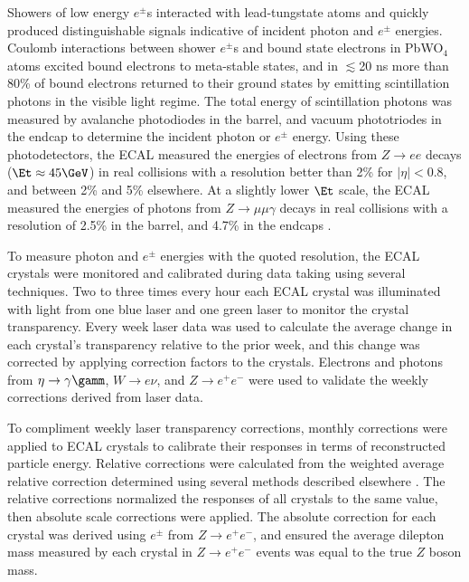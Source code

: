 Showers of low energy $e^{\pm}$s interacted with lead-tungstate atoms and quickly produced distinguishable 
signals indicative of incident photon and $e^{\pm}$ energies.  Coulomb interactions between shower $e^{\pm}$s 
and bound state electrons in PbWO$_{4}$ atoms excited bound electrons to meta-stable states, and in 
$\lesssim$20 ns more than 80\% of bound electrons returned to their ground states by emitting scintillation 
photons in the visible light regime.  The total energy of 
scintillation photons was measured by avalanche photodiodes in the barrel, and vacuum phototriodes in the 
endcap to determine the incident photon or $e^{\pm}$ energy.  Using these photodetectors, the ECAL measured 
the energies of electrons from $Z \rightarrow ee$ decays ($\Et \approx 45 \GeV$) in real collisions with a resolution 
better than 2\% for $|\eta| < 0.8$, and between 2\% and 5\% elsewhere.  
At a slightly lower $\Et$ scale, the ECAL measured the energies of photons from $Z \rightarrow \mu\mu\gamma$ 
decays in real collisions with a resolution of 2.5\% in the barrel, and 4.7\% in the endcaps \cite{ecalPerformanceInCollisions}.

To measure photon and $e^{\pm}$ energies with the quoted resolution, the ECAL crystals were monitored and calibrated 
during data taking using several techniques.  Two to three times every hour each ECAL crystal was illuminated 
with light from one blue laser and one green laser to monitor the crystal transparency.  Every week laser data 
was used to calculate the average change in each crystal's transparency relative to the prior week, and this change 
was corrected by applying correction factors to the crystals.  Electrons and photons from $\eta \rightarrow \gamma\gamm$, 
$W \rightarrow e\nu$, and $Z \rightarrow e^{+}e^{-}$ were used to validate the weekly corrections derived from laser data.

To compliment weekly laser transparency corrections, monthly corrections were applied to ECAL crystals 
to calibrate their responses in terms of reconstructed particle energy.  Relative corrections were calculated from 
the weighted average relative correction determined using several methods described elsewhere \cite{eGammaMonitCalib2011}.  
The relative corrections normalized the responses of all crystals to the same value, then absolute scale corrections 
were applied.  The absolute correction for each crystal was derived using $e^{\pm}$ from $Z \rightarrow e^{+}e^{-}$, 
and ensured the average dilepton mass measured by each crystal in $Z \rightarrow e^{+}e^{-}$ events was equal to the 
true $Z$ boson mass.

